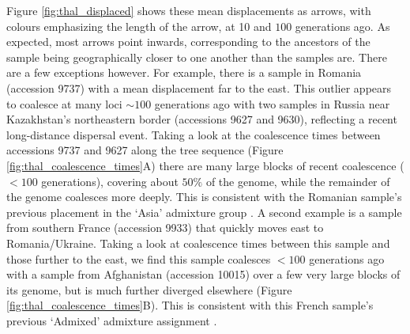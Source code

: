 \documentclass[12pt]{article}
\begin{document}
Figure \ref{fig:thal_displaced} shows these mean displacements as arrows, with colours emphasizing the length of the arrow, at 10 and $100$ generations ago.
As expected, most arrows point inwards, corresponding to the ancestors of the sample being geographically closer to one another than the samples are.
There are a few exceptions however.
For example, there is a sample in Romania (accession 9737) with a mean displacement far to the east.
This outlier appears to coalesce at many loci $\sim100$ generations ago with two samples in Russia near Kazakhstan's northeastern border (accessions 9627 and 9630), reflecting a recent long-distance dispersal event.
Taking a look at the coalescence times between accessions 9737 and 9627 along the tree sequence (Figure \ref{fig:thal_coalescence_times}A) there are many large blocks of recent coalescence ($<100$ generations), covering about $50\%$ of the genome, while the remainder of the genome coalesces more deeply.
This is consistent with the Romanian sample's previous placement in the `Asia' admixture group \citep{alonso2016}.
A second example is a sample from southern France (accession 9933) that quickly moves east to Romania/Ukraine.
Taking a look at coalescence times between this sample and those further to the east, we find this sample coalesces $<100$ generations ago with a sample from Afghanistan (accession 10015) over a few very large blocks of its genome, but is much further diverged elsewhere (Figure \ref{fig:thal_coalescence_times}B).
This is consistent with this French sample's previous `Admixed' admixture assignment \citep[including substantial ancestry from the `Central Asia' group;][]{alonso2016}. 

\end{document}
